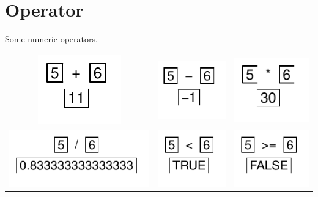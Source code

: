 \documentclass[pdflatex]{article}
\begin{document}
\section{Operator}

Some numeric operators.

\begin{tabular}{ccc}
\includegraphics{operator_plus} & \includegraphics{operator_minus} & \includegraphics{operator_time}\\
\includegraphics{operator_div} & \includegraphics{operator_strict_lt} & \includegraphics{operator_gt_or_equal}\\
\end{tabular}
\end{document}
